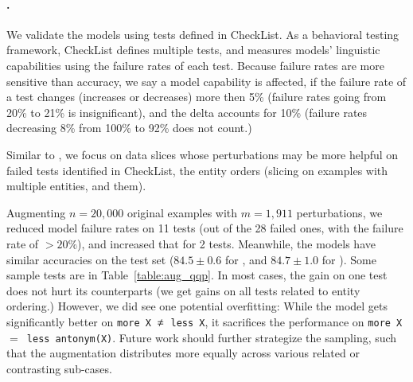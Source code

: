 \TableAugQQP

\paragraph{\qqp.}
We validate the models using tests defined in CheckList.
As a behavioral testing framework, CheckList defines multiple tests, and measures models' linguistic capabilities using the failure rates of each test.
Because failure rates are more sensitive than accuracy, we say a model capability is affected, if the failure rate of a test changes (increases or decreases) more then 5\% (\eg failure rates going from 20\% to 21\% is insignificant), and the delta accounts for 10\% (\eg failure rates decreasing 8\% from 100\% to 92\% does not count.)

Similar to \nli, we focus on data slices whose perturbations may be more helpful on failed tests identified in CheckList, \eg the entity orders (slicing on examples with multiple entities, and  them).

Augmenting $n=20,000$ original examples with $m=1,911$ perturbations, we reduced model failure rates on 11 tests (out of the 28 failed ones, with the failure rate of \mcomp $>20\%$), and increased that for 2 tests.
Meanwhile, the models have similar accuracies on the test set ($84.5 \pm 0.6$ for \maug, and $84.7 \pm 1.0$ for \mcomp).
Some sample tests are in Table~\ref{table:aug_qqp}.
In most cases, the gain on one test does not hurt its counterparts (\eg we get gains on all tests related to entity ordering.)
However, we did see one potential overfitting: While the model gets significantly better on  \texttt{more X $\not\eq$ less X}, it sacrifices the performance on \texttt{more X $=$ less antonym(X)}.
Future work should further strategize the sampling, such that the augmentation distributes more equally across various related or contrasting sub-cases. 

